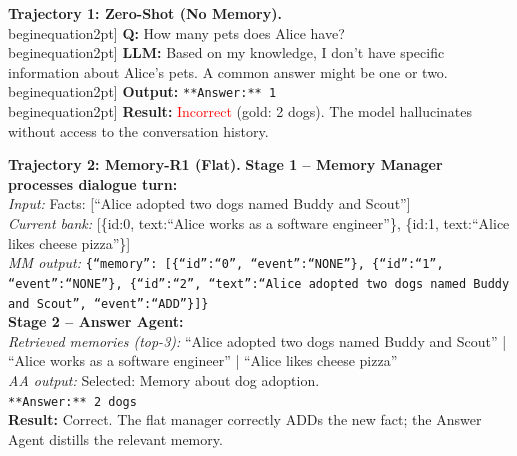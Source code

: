 \documentclass{article}
\theoremstyle{definition}
\begin{document}
\begin{tcolorbox}[aclbox, width=\linewidth]
\small
\textbf{Trajectory 1: Zero-Shot (No Memory).}\\begin{equation}2pt]
\textbf{Q:} How many pets does Alice have?\\begin{equation}2pt]
\textbf{LLM:} Based on my knowledge, I don't have specific information about Alice's pets. A common answer might be one or two.\\begin{equation}2pt]
\textbf{Output:} \texttt{**Answer:** 1}\\begin{equation}2pt]
\textbf{Result:} \textcolor{red}{Incorrect} (gold: 2 dogs). The model hallucinates without access to the conversation history.
\end{tcolorbox}

\begin{tcolorbox}[aclbox, width=\linewidth]
\small
\textbf{Trajectory 2: Memory-R1 (Flat).}
\textbf{Stage 1 -- Memory Manager processes dialogue turn:}\\
\textit{Input:} Facts: [``Alice adopted two dogs named Buddy and Scout'']\\
\textit{Current bank:} [\{id:0, text:``Alice works as a software engineer''\}, \{id:1, text:``Alice likes cheese pizza''\}]\\
\textit{MM output:} \texttt{\{``memory'': [\{``id'':``0'', ``event'':``NONE''\}, \{``id'':``1'', ``event'':``NONE''\}, \{``id'':``2'', ``text'':``Alice adopted two dogs named Buddy and Scout'', ``event'':``ADD''\}]\}}\\[4pt]
\textbf{Stage 2 -- Answer Agent:}\\
\textit{Retrieved memories (top-3):} ``Alice adopted two dogs named Buddy and Scout'' | ``Alice works as a software engineer'' | ``Alice likes cheese pizza''\\
\textit{AA output:} Selected: Memory about dog adoption.\\
\texttt{**Answer:** 2 dogs}\\[2pt]
\textbf{Result:} \textcolor{green!50!black}{Correct}. The flat manager correctly ADDs the new fact; the Answer Agent distills the relevant memory.
\end{tcolorbox}
\end{document}
